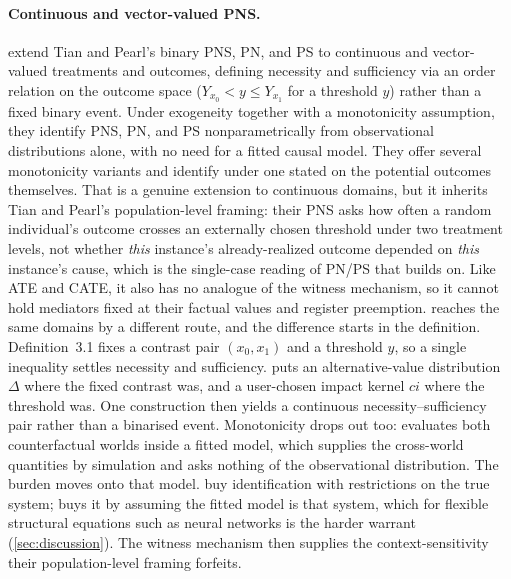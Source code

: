 \paragraph{Continuous and vector-valued PNS.}
\citet{kawakammi_2024_poc_for_cont_and_vec} extend Tian and Pearl's binary PNS, PN, and
PS to continuous and vector-valued treatments and outcomes, defining necessity and
sufficiency via an order relation on the outcome space ($Y_{x_0} < y \le Y_{x_1}$ for a
threshold $y$) rather than a fixed binary event. Under exogeneity together with a monotonicity
assumption, they identify PNS, PN, and PS nonparametrically from observational
distributions alone, with no need for a fitted causal model. They offer several
monotonicity variants and identify under one stated on the potential outcomes
themselves. That is a genuine extension to continuous
domains, but it inherits Tian and Pearl's population-level framing: their PNS asks how
often a random individual's outcome crosses an externally chosen threshold under two
treatment levels, not whether \emph{this} instance's already-realized outcome depended
on \emph{this} instance's cause, which is the single-case reading of PN/PS
\citep{pearl2022probabilities} that \ourapproach builds on. Like ATE and CATE, it also
has no analogue of the witness mechanism, so it cannot hold mediators fixed at their
factual values and register preemption. \Ourapproach reaches the same domains by a
different route, and the difference starts in the definition. Definition~3.1 fixes a
contrast pair $(x_0,x_1)$ and a threshold $y$, so a single inequality settles necessity
and sufficiency. \Ourapproach puts an alternative-value distribution $\Delta$ where the
fixed contrast was, and a user-chosen impact kernel $ci$ where the threshold was. One
construction then yields a continuous necessity--sufficiency pair rather than a
binarised event. Monotonicity drops out too: \ourapproach evaluates both counterfactual
worlds inside a fitted model, which supplies the cross-world quantities by simulation
and asks nothing of the observational distribution. The burden moves onto that model.
\citeauthor{kawakammi_2024_poc_for_cont_and_vec} buy identification with restrictions on
the true system; \ourapproach buys it by assuming the fitted model is that system, which
for flexible structural equations such as neural networks is the harder warrant
(\cref{sec:discussion}). The witness mechanism then supplies the context-sensitivity
their population-level framing forfeits.

